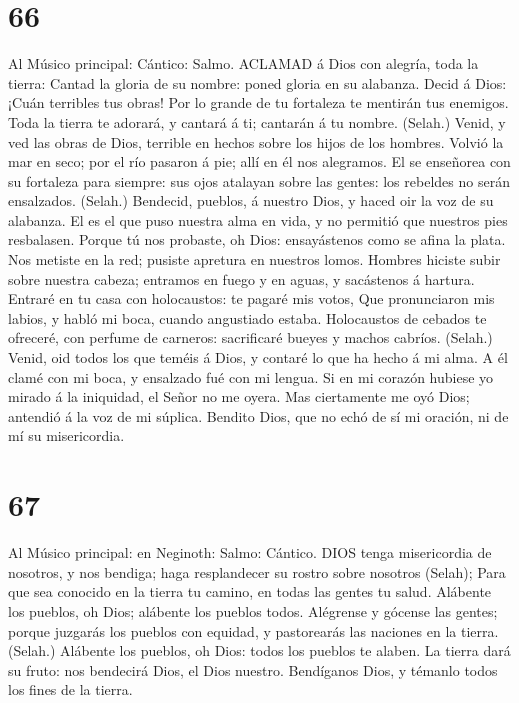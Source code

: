 \hypertarget{section-65}{%
\section{66}\label{section-65}}

 Al Músico principal: Cántico: Salmo. ACLAMAD á Dios con
alegría, toda la tierra:  Cantad la gloria de su nombre:
poned gloria en su alabanza.  Decid á Dios: ¡Cuán terribles
tus obras! Por lo grande de tu fortaleza te mentirán tus enemigos.
 Toda la tierra te adorará, y cantará á ti; cantarán á tu
nombre. (Selah.)  Venid, y ved las obras de Dios, terrible
en hechos sobre los hijos de los hombres.  Volvió la mar en
seco; por el río pasaron á pie; allí en él nos alegramos. 
El se enseñorea con su fortaleza para siempre: sus ojos atalayan sobre
las gentes: los rebeldes no serán ensalzados. (Selah.) 
Bendecid, pueblos, á nuestro Dios, y haced oir la voz de su alabanza.
 El es el que puso nuestra alma en vida, y no permitió que
nuestros pies resbalasen.  Porque tú nos probaste, oh Dios:
ensayástenos como se afina la plata.  Nos metiste en la
red; pusiste apretura en nuestros lomos.  Hombres hiciste
subir sobre nuestra cabeza; entramos en fuego y en aguas, y sacástenos á
hartura.  Entraré en tu casa con holocaustos: te pagaré mis
votos,  Que pronunciaron mis labios, y habló mi boca,
cuando angustiado estaba.  Holocaustos de cebados te
ofreceré, con perfume de carneros: sacrificaré bueyes y machos cabríos.
(Selah.)  Venid, oid todos los que teméis á Dios, y contaré
lo que ha hecho á mi alma.  A él clamé con mi boca, y
ensalzado fué con mi lengua.  Si en mi corazón hubiese yo
mirado á la iniquidad, el Señor no me oyera.  Mas
ciertamente me oyó Dios; antendió á la voz de mi súplica. 
Bendito Dios, que no echó de sí mi oración, ni de mí su misericordia.

\hypertarget{section-66}{%
\section{67}\label{section-66}}

 Al Músico principal: en Neginoth: Salmo: Cántico. DIOS
tenga misericordia de nosotros, y nos bendiga; haga resplandecer su
rostro sobre nosotros (Selah);  Para que sea conocido en la
tierra tu camino, en todas las gentes tu salud.  Alábente
los pueblos, oh Dios; alábente los pueblos todos.  Alégrense
y gócense las gentes; porque juzgarás los pueblos con equidad, y
pastorearás las naciones en la tierra. (Selah.)  Alábente
los pueblos, oh Dios: todos los pueblos te alaben.  La
tierra dará su fruto: nos bendecirá Dios, el Dios nuestro. 
Bendíganos Dios, y témanlo todos los fines de la tierra.

